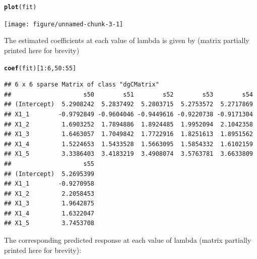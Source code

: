 \documentclass[12pt,letter]{article}\usepackage[]{graphicx}\usepackage[]{color}
\makeatletter
\newcommand{\hlnum}[1]{\textcolor[rgb]{0.686,0.059,0.569}{#1}}%
\newcommand{\hlopt}[1]{\textcolor[rgb]{0,0,0}{#1}}%
\newcommand{\hlstd}[1]{\textcolor[rgb]{0.345,0.345,0.345}{#1}}%
\newcommand{\hlkwd}[1]{\textcolor[rgb]{0.737,0.353,0.396}{\textbf{#1}}}%
\newenvironment{kframe}{%
 \def\at@end@of@kframe{}%
 \ifinner\ifhmode%
  \def\at@end@of@kframe{\end{minipage}}%
  \begin{minipage}{\columnwidth}%
 \fi\fi%
 \def\FrameCommand##1{\hskip\@totalleftmargin \hskip-\fboxsep
 \colorbox{shadecolor}{##1}\hskip-\fboxsep
     \hskip-\linewidth \hskip-\@totalleftmargin \hskip\columnwidth}%
 \MakeFramed {\advance\hsize-\width
   \@totalleftmargin\z@ \linewidth\hsize
   \@setminipage}}%
 {\par\unskip\endMakeFramed%
 \at@end@of@kframe}
\newenvironment{knitrout}{}{} %
\makeatother
\begin{document}
\begin{knitrout}\scriptsize
{}\color{fgcolor}\begin{kframe}
\begin{alltt}
\hlkwd{plot}\hlstd{(fit)}
\end{alltt}
\end{kframe}

{\centering \texttt{[image: figure/unnamed-chunk-3-1]} 

}



\end{knitrout}


The estimated coefficients at each value of lambda is given by (matrix partially printed here for brevity)

\begin{knitrout}\scriptsize
{}\color{fgcolor}\begin{kframe}
\begin{alltt}
\hlkwd{coef}\hlstd{(fit)[}\hlnum{1}\hlopt{:}\hlnum{6}\hlstd{,}\hlnum{50}\hlopt{:}\hlnum{55}\hlstd{]}
\end{alltt}
\begin{verbatim}
## 6 x 6 sparse Matrix of class "dgCMatrix"
##                    s50        s51        s52        s53        s54
## (Intercept)  5.2908242  5.2837492  5.2803715  5.2753572  5.2717869
## X1_1        -0.9792849 -0.9604046 -0.9449616 -0.9220738 -0.9171304
## X1_2         1.6903252  1.7894886  1.8924485  1.9952094  2.1042358
## X1_3         1.6463057  1.7049842  1.7722916  1.8251613  1.8951562
## X1_4         1.5224653  1.5433528  1.5663095  1.5854332  1.6102159
## X1_5         3.3386403  3.4183219  3.4908074  3.5763781  3.6633809
##                    s55
## (Intercept)  5.2695399
## X1_1        -0.9270958
## X1_2         2.2058453
## X1_3         1.9642875
## X1_4         1.6322047
## X1_5         3.7453708
\end{verbatim}
\end{kframe}
\end{knitrout}



The corresponding predicted response at each value of lambda (matrix partially printed here for brevity):
\end{document}
